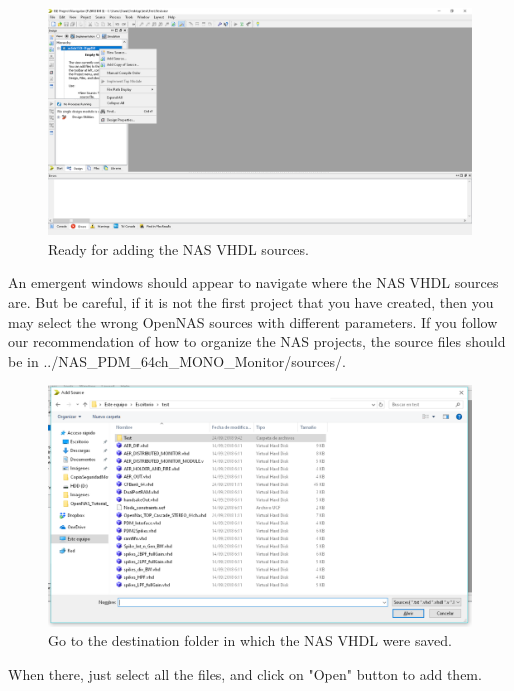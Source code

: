 \begin{figure}[H]
\centering
\includegraphics[width=1\textwidth]{images/Img34_AddSource.PNG}
\caption{\label{fig:ISE_add_sources}Ready for adding the NAS VHDL sources.}
\end{figure}

An emergent windows should appear to navigate where the NAS VHDL sources are. But be careful, if it is not the first project that you have created, then you may select the wrong OpenNAS sources with different parameters. If you follow our recommendation of how to organize the NAS projects, the source files should be in ../NAS\_PDM\_64ch\_MONO\_Monitor/sources/.

\begin{figure}[H]
\centering
\includegraphics[width=1\textwidth]{images/Img35_SelectFiles.PNG}
\caption{\label{fig:ISE_look_for_sources}Go to the destination folder in which the NAS VHDL were saved.}
\end{figure}

When there, just select all the files, and click on "Open" button to add them.

